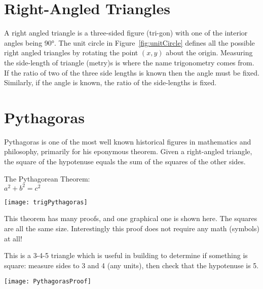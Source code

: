 \section{Right-Angled Triangles}
A right angled triangle is a three-sided figure (tri-gon) with one of the interior angles being \ang{90}. The unit circle in Figure~\ref{fig:unitCircle} defines all the possible right angled triangles by rotating the point $(x,y)$ about the origin. Measuring the side-length of triangle (metry)s is where the name trigonometry comes from. If the ratio of two of the three side lengths is known then the angle must be fixed. Similarly, if the angle is known, the ratio of the side-lengths is fixed.

\section*{Pythagoras}
Pythagoras is one of the most well known historical figures in mathematics and philosophy, primarily for his eponymous theorem. Given a right-angled triangle, the square of the hypotenuse equals the sum of the squares of the other sides.
\begin{tcolorbox}[colback=white]
	\begin{multicols}{2}
		\begin{center}
			The Pythagorean Theorem:\\
			\vspace{1cm}$a^2+b^2=c^2$
		\end{center}
		\columnbreak
		\begin{center}
			\texttt{[image: trigPythagoras]}
		\end{center}
	\end{multicols}
\end{tcolorbox}
\begin{multicols}{2}
This theorem has many proofs, and one graphical one is shown here. The squares are all the same size. Interestingly this proof does not require any math (symbols) at all!

This is a 3-4-5 triangle which is useful in building to determine if something is square: measure sides to 3 and 4 (any units), then check that the hypotenuse is 5.
\columnbreak
\begin{center}
	\texttt{[image: PythagorasProof]}
\end{center}
\end{multicols}
